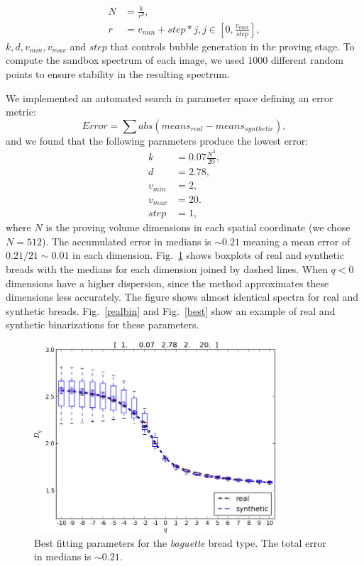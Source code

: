 \documentclass[spanish,a4paper,11pt,oneside,links]{report}
\begin{document}
\begin{align*}
N &= \frac{k}{r^{d}},\\ r &= v_{min}+step*j, j \in [0,\frac{v_{max}}{step}],
\end{align*}
$k,d,v_{min},v_{max}$ and $step$ that controls bubble generation in the proving stage.
To compute the sandbox spectrum of each image, we used $1000$ different random points to ensure stability in the resulting spectrum.

We implemented an automated search in parameter space defining an error metric: 
\begin{equation*}
Error = \displaystyle \sum abs(means_{real}-means_{synthetic}),
\end{equation*}
and we found that the following parameters produce the lowest error:
\begin{align*}
k &= 0.07 \frac{N^{3}}{20} ,\\
d &=2.78,\\
v_{min} &=2,\\
v_{max} &=20.\\
step &=1,
\end{align*}
where $N$ is the proving volume dimensions in each spatial coordinate (we chose $N = 512$). 
The accumulated error in medians is $\sim 0.21$ meaning a mean error of $0.21/21 \sim 0.01$ in each dimension.
Fig.~\ref{bestboxplot} shows boxplots of real and synthetic breads with the medians for each dimension joined by dashed lines.
When $q < 0$ dimensions have a higher dispersion, since the method approximates these dimensions less accurately.
The figure shows almost identical spectra for real and synthetic breads. Fig.~\ref{realbin} and Fig.~\ref{best} show an example of real and synthetic binarizations for these parameters.


\begin{figure}[!ht]
\includegraphics[width=9cm]{figures/bestboxplot}
\caption{Best fitting parameters for the {\em baguette} bread type. The total error in medians is $\sim 0.21$.}
\label{bestboxplot}
\end{figure}
\end{document}
